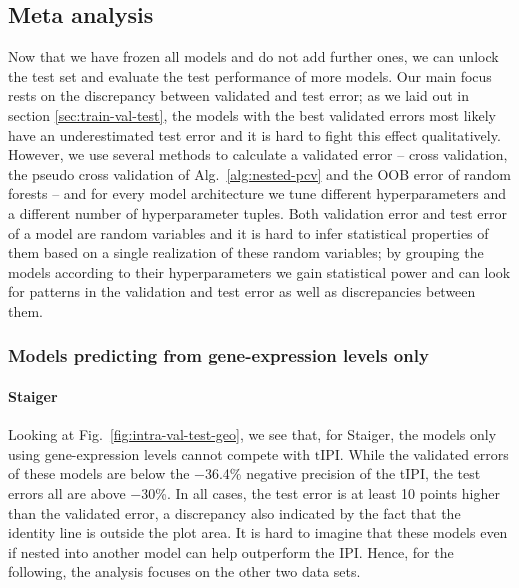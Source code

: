 \subsection{Meta analysis}

Now that we have frozen all models and do not add further ones, we can unlock the test set and 
evaluate the test performance of more models. Our main focus rests on the discrepancy between 
validated and test error; as we laid out in section \ref{sec:train-val-test}, the models with the 
best validated errors most likely have an underestimated test error and it is hard to fight this 
effect qualitatively. However, we use several methods to calculate a validated error -- cross 
validation, the pseudo cross validation of Alg.\ \ref{alg:nested-pcv} and the OOB error of random 
forests -- and for every model architecture we tune different hyperparameters and a different 
number of hyperparameter tuples. Both validation error and test error of a model are random 
variables and it is hard to infer statistical properties of them based on a single realization of 
these random variables; by grouping the models according to their hyperparameters we gain 
statistical power and can look for patterns in the validation and test error as well as 
discrepancies between them.

\subsubsection{Models predicting from gene-expression levels only}



\paragraph{Staiger}
Looking at Fig.\ \ref{fig:intra-val-test-geo}, we see that, for Staiger, the models only using 
gene-expression levels cannot compete with $\text{tIPI}$. While the validated errors of these models are 
below the \num{-36.4}\% negative precision of the tIPI, the test errors all are above \num{-30}\%. 
In all cases, the test error is at least 10 points higher than the validated error, a discrepancy 
also indicated by the fact that the identity line is outside the plot area. It is hard to imagine that 
these models even if nested into another model can help outperform the IPI. Hence, for the 
following, the analysis focuses on the other two data sets.

